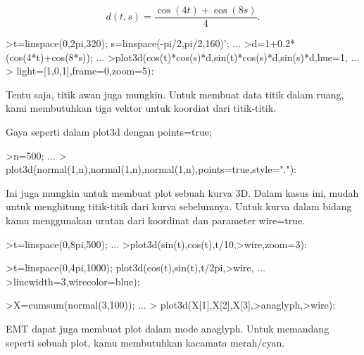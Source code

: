 \documentclass[a4paper,10pt]{article}
\begin{document}
\begin{eulernotebook}
\begin{eulercomment}
\end{eulercomment}
\begin{eulerformula}
\[
d(t,s) = \frac{\cos(4t)+\cos(8s)}{4}.
\]
\end{eulerformula}
\begin{eulerprompt}
>t=linspace(0,2pi,320); s=linspace(-pi/2,pi/2,160)'; ...
>d=1+0.2*(cos(4*t)+cos(8*s)); ...
>plot3d(cos(t)*cos(s)*d,sin(t)*cos(s)*d,sin(s)*d,hue=1, ...
>  light=[1,0,1],frame=0,zoom=5):
\end{eulerprompt}
\begin{eulercomment}
Tentu saja, titik awan juga mungkin. Untuk membuat data titik dalam
ruang, kami membutuhkan tiga vektor untuk koordiat dari titik-titik.

Gaya seperti dalam plot3d dengan points=true;
\end{eulercomment}
\begin{eulerprompt}
>n=500;  ...
>  plot3d(normal(1,n),normal(1,n),normal(1,n),points=true,style="."):
\end{eulerprompt}
\begin{eulercomment}
Ini juga mungkin untuk membuat plot sebuah kurva 3D. Dalam kasus ini,
mudah untuk menghitung titik-titik dari kurva sebelumnya. Untuk kurva
dalam bidang kamu menggunakan urutan dari koordinat dan parameter
wire=true.
\end{eulercomment}
\begin{eulerprompt}
>t=linspace(0,8pi,500); ...
>plot3d(sin(t),cos(t),t/10,>wire,zoom=3):
\end{eulerprompt}
\begin{eulerprompt}
>t=linspace(0,4pi,1000); plot3d(cos(t),sin(t),t/2pi,>wire, ...
>linewidth=3,wirecolor=blue):
\end{eulerprompt}
\begin{eulerprompt}
>X=cumsum(normal(3,100)); ...
> plot3d(X[1],X[2],X[3],>anaglyph,>wire):
\end{eulerprompt}
\begin{eulercomment}
EMT dapat juga membuat plot dalam mode anaglyph. Untuk memandang
seperti sebuah plot, kamu membutuhkan kacamata merah/cyan.
\end{eulercomment}

\end{eulernotebook}
\end{document}
